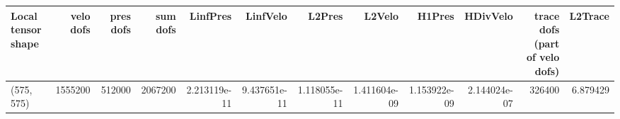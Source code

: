 \begin{tabular}{lrrrrrrrrrrr}
\toprule
Local tensor shape &  velo dofs &  pres dofs &  sum dofs &     LinfPres &     LinfVelo &       L2Pres &       L2Velo &       H1Pres &     HDivVelo &  trace dofs (part of velo dofs) &  L2Trace \\
\midrule
        (575, 575) &    1555200 &     512000 &   2067200 & 2.213119e-11 & 9.437651e-11 & 1.118055e-11 & 1.411604e-09 & 1.153922e-09 & 2.144024e-07 &                          326400 & 6.879429 \\
\bottomrule
\end{tabular}
